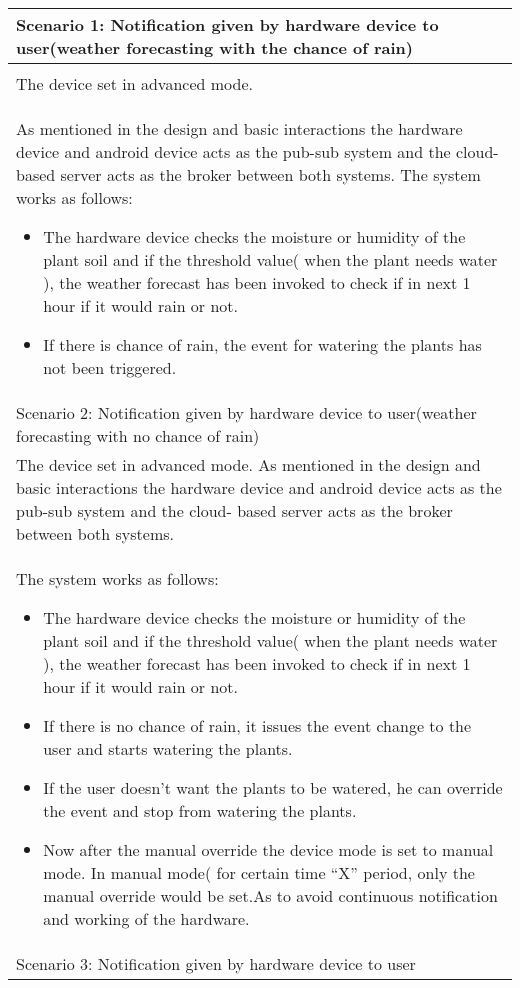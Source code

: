 \documentclass[10pt]{article}
\begin{document}
\begin{longtable}{p{}}%
\hline
Scenario 1: Notification given by hardware device to user(weather forecasting with the chance of rain)  \\
\hline    \\

The device set in advanced mode.\\
As mentioned in the design and basic interactions the hardware device and android device acts as the pub-sub system and the cloud- based server acts as the broker between both systems. The system works as follows:
\begin{itemize}
\item
The hardware device checks the moisture or humidity of the plant soil and if the threshold value( when the plant needs water ), the weather forecast has been invoked to check if in next 1 hour if it would rain or not.
\item
If there is chance of rain, the event for watering the plants has not been triggered.
\end{itemize}\\


\hline
Scenario 2: Notification given by hardware device to user(weather forecasting with no chance of rain)\\
\hline

The device set in advanced mode.
As mentioned in the design and basic interactions the hardware device and android device acts as the pub-sub system and the cloud- based server acts as the broker between both systems.\\ The system works as follows:
\begin{itemize}
\item The hardware device checks the moisture or humidity of the plant soil and if the threshold value( when the plant needs water ), the weather forecast has been invoked to check if in next 1 hour if it would rain or not.
\item If there is no chance of rain, it issues the event change to the user and starts watering the plants.
\item If the user doesn’t want the plants to be watered, he can override the event and stop from watering the plants.
\item Now after the manual override the device mode is set to manual mode. In manual mode( for certain time “X” period, only the manual override would be set.As to avoid continuous notification and working of the hardware.
\end{itemize}
\\
\hline
Scenario 3: Notification given by hardware device to user\\
\hline
 

\end{longtable}
\end{document}
